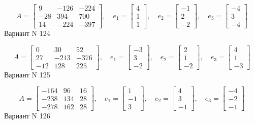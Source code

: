 \documentclass[11pt]{report}
\begin{document}
$$A = \left[\begin{matrix}9 & -126 & -224\\-28 & 394 & 700\\14 & -224 & -397\end{matrix}\right],\quad e_1 = \left[\begin{matrix}4\\1\\1\end{matrix}\right],\quad e_2 = \left[\begin{matrix}-1\\2\\-2\end{matrix}\right],\quad e_3 = \left[\begin{matrix}-4\\3\\-4\end{matrix}\right]$$Вариант N 124

$$A = \left[\begin{matrix}0 & 30 & 52\\27 & -213 & -376\\-12 & 128 & 225\end{matrix}\right],\quad e_1 = \left[\begin{matrix}-3\\3\\-2\end{matrix}\right],\quad e_2 = \left[\begin{matrix}2\\1\\-2\end{matrix}\right],\quad e_3 = \left[\begin{matrix}4\\1\\-3\end{matrix}\right]$$Вариант N 125

$$A = \left[\begin{matrix}-164 & 96 & 16\\-238 & 134 & 28\\-278 & 162 & 28\end{matrix}\right],\quad e_1 = \left[\begin{matrix}1\\-1\\3\end{matrix}\right],\quad e_2 = \left[\begin{matrix}4\\3\\-1\end{matrix}\right],\quad e_3 = \left[\begin{matrix}-4\\-2\\-1\end{matrix}\right]$$Вариант N 126
\end{document}
